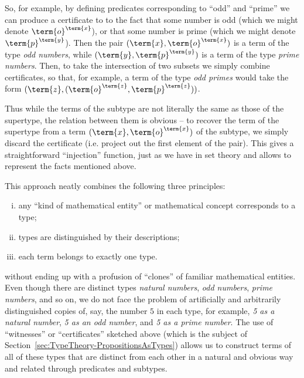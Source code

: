 So, for example, by defining predicates corresponding to ``odd'' and ``prime'' we can produce a certificate to to the fact that some number  is odd (which we might denote $\term{o}^{\term{x}}$), or that some number  is prime (which we might denote $\term{p}^{\term{y}}$).  Then the pair 
$(\term{x}, \term{o}^{\term{x}})$ is a term of the type \emph{odd numbers}, while 
$(\term{y}, \term{p}^{\term{y}})$ is a term of the type \emph{prime numbers}. Then, to take the intersection of two subsets we simply combine certificates, so that, for example, a term of the type \emph{odd primes} would take the form
$(\term{z}, (\term{o}^{\term{z}}, \term{p}^{\term{z}}))$.

Thus while the terms of the subtype 
are not literally the same as those of the supertype, the relation between them is obvious -- to recover the term  of the supertype from a term $(\term{x}, \term{o}^{\term{x}})$ of the subtype, we simply discard the certificate (i.e. project out the first element of the pair).  This gives a straightforward ``injection'' function, just as we have in set theory and allows to represent the facts mentioned above. 

\begin{samepage}
This approach neatly combines the following three principles:
\begin{enumerate}[(i)]
\item any ``kind of mathematical entity'' or mathematical concept corresponds to a type;
\item types are distinguished by their descriptions;
\item each term belongs to exactly one type.
\end{enumerate}
\end{samepage}
without ending up with a profusion of ``clones'' of familiar mathematical entities.
Even though there are distinct types 
\emph{natural numbers}, 
\emph{odd numbers}, 
\emph{prime numbers}, and so on, we do not face the problem of artificially and arbitrarily distinguished copies of, say, the number $5$ in each type, for example, \emph{5 as a natural number}, 
\emph{5 as an odd number}, and
\emph{5 as a prime number}.
The use of ``witnesses'' or ``certificates'' 
sketched above (which is the subject of Section~\ref{sec:TypeTheory-PropositionsAsTypes}) allows us to construct terms of all of these types that are distinct from each other in a natural and obvious way and related through predicates and subtypes.

